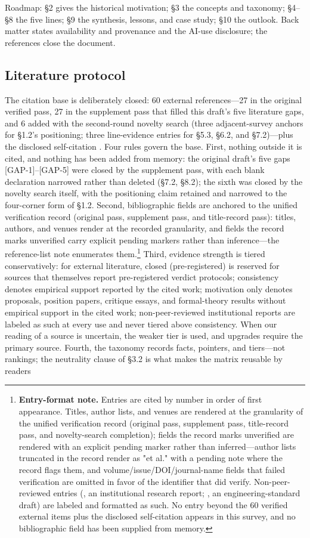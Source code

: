 \documentclass[11pt,a4paper]{article}
\begin{document}
Roadmap: §2 gives the historical motivation; §3 the concepts and taxonomy; §4–§8 the five lines; §9 the synthesis, lessons, and case study; §10 the outlook. Back matter states availability and provenance and the AI-use disclosure; the references close the document.

\subsection{Literature protocol}

The citation base is deliberately closed: 60 external references—27 in the original verified pass, 27 in the supplement pass that filled this draft's five literature gaps, and 6 added with the second-round novelty search (three adjacent-survey anchors for §1.2's positioning; three line-evidence entries for §5.3, §6.2, and §7.2)—plus the disclosed self-citation \cite{key04}. Four rules govern the base. First, nothing outside it is cited, and nothing has been added from memory: the original draft's five gaps [GAP-1]–[GAP-5] were closed by the supplement pass, with each blank declaration narrowed rather than deleted (§7.2, §8.2); the sixth was closed by the novelty search itself, with the positioning claim retained and narrowed to the four-corner form of §1.2. Second, bibliographic fields are anchored to the unified verification record (original pass, supplement pass, and title-record pass): titles, authors, and venues render at the recorded granularity, and fields the record marks unverified carry explicit pending markers rather than inference—the reference-list note enumerates them.\footnote{\textbf{Entry-format note.} Entries are cited by number in order of first appearance. Titles, author lists, and venues are rendered at the granularity of the unified verification record (original pass, supplement pass, title-record pass, and novelty-search completion); fields the record marks unverified are rendered with an explicit pending marker rather than inferred—author lists truncated in the record render as "et al." with a pending note where the record flags them, and volume/issue/DOI/journal-name fields that failed verification are omitted in favor of the identifier that did verify. Non-peer-reviewed entries (\cite{key31}, an institutional research report; \cite{key51}, an engineering-standard draft) are labeled and formatted as such. No entry beyond the 60 verified external items plus the disclosed self-citation \cite{key04} appears in this survey, and no bibliographic field has been supplied from memory.} Third, evidence strength is tiered conservatively: for external literature, closed (pre-registered) is reserved for sources that themselves report pre-registered verdict protocols; consistency denotes empirical support reported by the cited work; motivation only denotes proposals, position papers, critique essays, and formal-theory results without empirical support in the cited work; non-peer-reviewed institutional reports are labeled as such at every use and never tiered above consistency. When our reading of a source is uncertain, the weaker tier is used, and upgrades require the primary source. Fourth, the taxonomy records facts, pointers, and tiers—not rankings; the neutrality clause of §3.2 is what makes the matrix reusable by readers 
\end{document}
